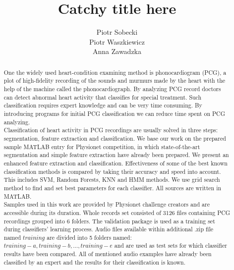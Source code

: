 \documentclass[10pt,a4paper]{article}
\title{Catchy title here}
\author{Piotr Sobecki \\
		Piotr Waszkiewicz \\
		Anna Zawadzka }
\begin{document}
\maketitle

\begin{abstract}
One the widely used heart-condition examining method is phonocardiogram (PCG), a plot of high-fidelity recording of the sounds and murmurs made by the heart with the help of the machine called the phonocardiograph. By analyzing PCG record doctors can detect abnormal heart activity that classifies for special treatment. Such classification requires expert knowledge and can be very time consuming. By introducing programs for initial PCG classification we can reduce time spent on PCG analyzing. \\

Classification of heart activity in PCG recordings are usually solved in three steps: segmentation, feature extraction and classification. We base our work on the prepared sample MATLAB entry for Physionet competition, in which state-of-the-art segmentation and simple feature extraction have already been prepared. We present an enhanced feature extraction and classification. Effectiveness of some of the best known classification methods is compared by taking their accuracy and speed into account. This includes SVM, Random Forests, KNN and HMM methods. We use grid search method to find and set best parameters for each classifier. All sources are written in MATLAB. \\

Samples used in this work are provided by Physionet challenge creators and are accessible during its duration. Whole records set consisted of 3126 files containing PCG recordings grouped into 6 folders. The validation package is used as a training set during classifiers' learning process. Audio files available within additional .zip file named $training$ are divided into 5 folders named: $training-a, training-b, \dots, training-e$ and are used as test sets for which classifier results have been compared. All of mentioned audio examples have already been classified by an expert and the results for their classification is known.
\end{abstract}
\vfill
\end{document}
